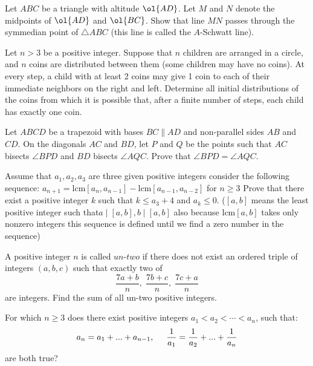 \documentclass[11pt]{scrartcl}
\begin{document}
\begin{problem}
  Let $ABC$ be a triangle with altitude $\ol{AD}$.
  Let $M$ and $N$ denote the midpoints of $\ol{AD}$ and $\ol{BC}$.
  Show that line $MN$ passes through
  the symmedian point of $\triangle ABC$
  (this line is called the $A$-Schwatt line).
\end{problem}
\begin{problem}[IMO SL 2022/C4]
Let $n > 3$ be a positive integer. Suppose that $n$ children are arranged in a circle, and $n$ coins are distributed between them (some children may have no coins). At every step, a child with at least 2 coins may give 1 coin to each of their immediate neighbors on the right and left. Determine all initial distributions of the coins from which it is possible that, after a finite number of steps, each child has exactly one coin.  
\end{problem}
\begin{problem}
Let $ABCD$ be a trapezoid with bases $BC \parallel AD$ and non-parallel sides $AB$ and $CD$. On the diagonals $AC$ and $BD$, let $P$ and $Q$ be the points such that $AC$ bisects $\angle BPD$ and $BD$ bisects $\angle AQC$. Prove that $\angle BPD = \angle AQC$.
\end{problem}
\begin{problem}
Assume that $a_1, a_2, a_3$ are three given positive integers consider the following sequence:
$a_{n+1}=\text{lcm}[a_n, a_{n-1}]-\text{lcm}[a_{n-1}, a_{n-2}]$ for $n\ge 3$
Prove that there exist a positive integer $k$ such that $k\le a_3+4$ and $a_k\le 0$.
($[a, b]$ means the least positive integer such that$ a\mid[a,b], b\mid[a, b]$ also because $\text{lcm}[a, b]$ takes only nonzero integers this sequence is defined until we find a zero number in the sequence)
\end{problem}
\begin{problem}[DIME 2022/11]
A positive integer $n$ is called $\textit{un-two}$ if there does not exist an ordered triple of integers $(a,b,c)$ such that exactly two of$$\dfrac{7a+b}{n},\;\dfrac{7b+c}{n},\;\dfrac{7c+a}{n}$$are integers. Find the sum of all un-two positive integers.
\end{problem}
\begin{problem}
For which $n\ge 3$ does there exist positive integers $a_1<a_2<\cdots <a_n$, such that:$$a_n=a_1+...+a_{n-1}, \hspace{0.5cm} \frac{1}{a_1}=\frac{1}{a_2}+...+\frac{1}{a_n}$$are both true?
\end{problem}
\end{document}
